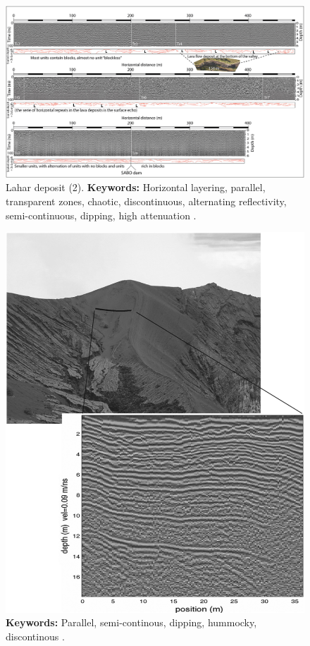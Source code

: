 \begin{landscape}
    \begin{figure}[h!]
    \centering
    \includegraphics[width=0.9\linewidth]{Figures/0.2GPR/Gomez2018_2.jpg}
    \caption[Lahar deposit (2).]{Lahar deposit (2). \textbf{Keywords: } Horizontal layering, parallel, transparent zones, chaotic, discontinuous, alternating reflectivity, semi-continuous, dipping, high attenuation \citep{Gomez2018}.}
    \label{fig:Gomez2018-2}
\end{figure}
\end{landscape}
\clearpage

\begin{figure}[h!]
    \centering
    \includegraphics[width=0.9\linewidth]{Figures/0.2GPR/Kruse2010_tephra_3.png}
    \caption[Irazú intracrater tephra 1963-1965 deposits.]{\textbf{Keywords: } Parallel, semi-continous, dipping, hummocky, discontinous \citep{Kruse2010}.}
    \label{fig:Kruse2010-3}
\end{figure}
\clearpage

